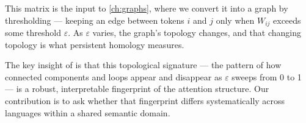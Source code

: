 This matrix is the input to \autoref{ch:graphs}, where we convert it into a graph by thresholding --- keeping an edge between tokens $i$ and $j$ only when $W_{ij}$ exceeds some threshold $\varepsilon$. As $\varepsilon$ varies, the graph's topology changes, and that changing topology is what persistent homology measures.

The key insight of \textcite{kushnareva2021} is that this topological signature --- the pattern of how connected components and loops appear and disappear as $\varepsilon$ sweeps from 0 to 1 --- is a robust, interpretable fingerprint of the attention structure. Our contribution is to ask whether that fingerprint differs systematically across languages within a shared semantic domain.
